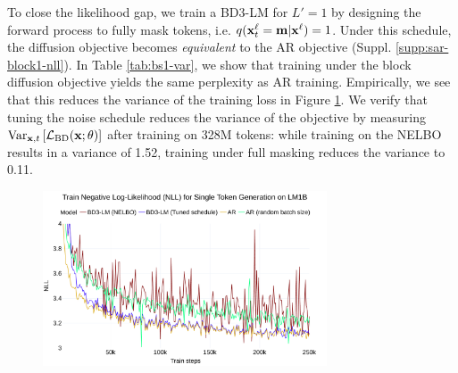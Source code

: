\documentclass{article} %
\def\algo{BD3-LM}
\begin{document}
To close the likelihood gap, we train a \algo{} for $L'=1$ by designing the forward process to fully mask tokens, i.e. $q({\mathbf x}^\ell_t = {\mathbf m} | {\mathbf x}^\ell) =1$. Under this schedule, the diffusion objective becomes \textit{equivalent} to the AR objective (Suppl. \ref{supp:sar-block1-nll}). In Table \ref{tab:bs1-var}, we show that training under the block diffusion objective yields the same perplexity as AR training. Empirically, we see that this reduces the variance of the training loss in Figure \ref{figs/bs-1}. We verify  that tuning the noise schedule reduces the variance of the objective by measuring $\text{Var}_{{\mathbf x}, t} \left[ \mathcal{L}_{\text{BD}} ({\mathbf x}; \theta)\right]$ after training on 328M tokens: while training on the NELBO results in a variance of 1.52, training under full masking reduces the variance to 0.11.
\begin{figure}
\centering
    \includegraphics[width=0.75\textwidth]{figs/bs1.pdf}
    \label{figs/bs-1}
\end{figure}
\end{document}
